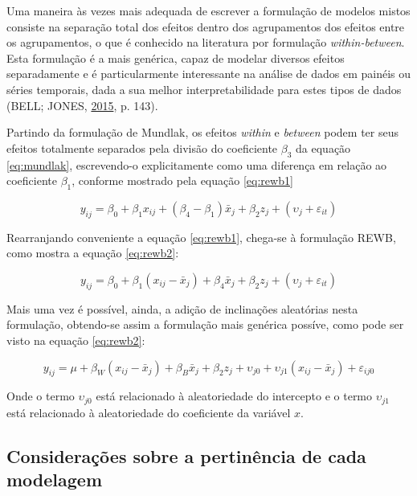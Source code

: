 \documentclass[
  a4paper, 11pt]{article}
\begin{document}
Uma maneira às vezes mais adequada de escrever a formulação de modelos
mistos consiste na separação total dos efeitos dentro dos agrupamentos
dos efeitos entre os agrupamentos, o que é conhecido na literatura por
formulação \emph{within-between}. Esta formulação é a mais genérica,
capaz de modelar diversos efeitos separadamente e é particularmente
interessante na análise de dados em painéis ou séries temporais, dada a
sua melhor interpretabilidade para estes tipos de dados (BELL; JONES,
\protect\hyperlink{ref-bell2015}{2015}, p. 143).

Partindo da formulação de Mundlak, os efeitos \emph{within} e
\emph{between} podem ter seus efeitos totalmente separados pela divisão
do coeficiente \(\beta_3\) da equação \ref{eq:mundlak}, escrevendo-o
explicitamente como uma diferença em relação ao coeficiente \(\beta_1\),
conforme mostrado pela equação \ref{eq:rewb1}

\begin{equation} \label{eq:rewb1}
y_{ij} = \beta_0 + \beta_1 x_{ij} + (\beta_{4} - \beta_1) \bar{x}_j+ \beta_2 z_j + (\upsilon_j + \varepsilon_{it}) 
\end{equation}

Rearranjando conveniente a equação \ref{eq:rewb1}, chega-se à formulação
REWB, como mostra a equação \ref{eq:rewb2}:

\begin{equation} \label{eq:rewb1}
y_{ij} = \beta_0 + \beta_1 (x_{ij} - \bar{x}_j) + \beta_4 \bar{x}_j+ \beta_2 z_j + (\upsilon_j + \varepsilon_{it}) 
\end{equation}

Mais uma vez é possível, ainda, a adição de inclinações aleatórias nesta
formulação, obtendo-se assim a formulação mais genérica possíve, como
pode ser visto na equação \ref{eq:rewb2}:

\begin{equation} \label{eq:rewb2}
y_{ij} = \mu + \beta_{W} (x_{ij} - \bar{x}_j) + \beta_{B}\bar{x}_j+ 
\beta_2 z_j + \upsilon_{j0} + \upsilon_{j1} (x_{ij} - \bar{x}_j) + \varepsilon_{ij0} 
\end{equation}

Onde o termo \(\upsilon_{j0}\) está relacionado à aleatoriedade do
intercepto e o termo \(\upsilon_{j1}\) está relacionado à aleatoriedade
do coeficiente da variável \(x\).

\hypertarget{considerauxe7uxf5es-sobre-a-pertinuxeancia-de-cada-modelagem}{%
\subsection{Considerações sobre a pertinência de cada
modelagem}\label{considerauxe7uxf5es-sobre-a-pertinuxeancia-de-cada-modelagem}}
\end{document}
